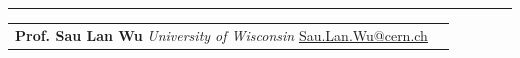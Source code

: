 \documentclass{letter}
\begin{document}
\begin{flushleft}
\Large{\textsc{\textbf{\color{Maroon}{References}}}}
\hrule
\end{flushleft}

\begin{tabular}{p{}p{}}
	\textbf{Prof. Sau Lan Wu} \newline
	\textit{University of Wisconsin} \newline
	\href{mailto:Sau.Lan.Wu@cern.ch}{Sau.Lan.Wu@cern.ch}
	&

\end{tabular}
\end{document}
